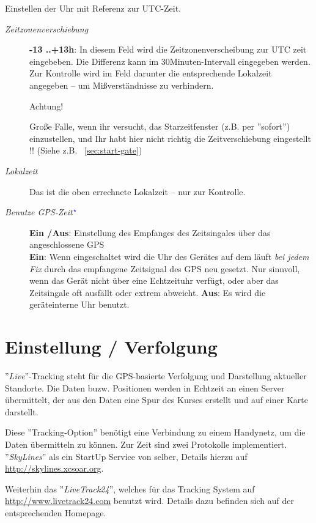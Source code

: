 Einstellen der Uhr mit Referenz zur UTC-Zeit.

\begin{description}
\item[\textit{Zeitzonenverschiebung}]  {\bf -13 ..+13h}: In diesem Feld wird die Zeitzonenverscheibung zur UTC zeit eingebeben. Die Differenz kann im 30Minuten-Intervall eingegeben werden.
Zur Kontrolle wird im Feld darunter die entsprechende Lokalzeit angegeben -- um Mißverständnisse zu verhindern.

Achtung! 

Große Falle, wenn ihr versucht, das Starzeitfenster (z.B. per ''sofort'') einzustellen, und Ihr habt \warning hier nicht richtig die Zeitverschiebung eingestellt !! (Siehe z.B. ~\ref{sec:start-gate})
\item[\textit{Lokalzeit}]  Das ist die oben errechnete Lokalzeit -- nur zur Kontrolle.
\item[\textit{Benutze GPS-Zeit$^{\textcolor{blue}{\star}}$}] {\bf Ein /Aus}: Einstellung des Empfanges des Zeitsingales über das angeschlossene GPS\\
{\bf Ein}: Wenn eingeschaltet wird die Uhr des Gerätes auf dem \xc läuft \textsl{bei jedem Fix} durch das empfangene Zeitsignal des GPS neu gesetzt.
\achtung
Nur sinnvoll, wenn das Gerät nicht über eine Echtzeituhr verfügt, oder aber das Zeitsingale oft ausfällt oder extrem abweicht.
{\bf Aus}: Es wird die geräteinterne Uhr benutzt.
\end{description}


\section{Einstellung / Verfolgung}

''{\it Live}''-Tracking steht für die GPS-basierte Verfolgung und Darstellung aktueller Standorte.
Die Daten buzw. Positionen werden in Echtzeit an einen Server übermittelt, der aus den Daten
eine Spur des Kurses erstellt und auf einer Karte darstellt.

Diese ''Tracking-Option'' benötigt eine  Verbindung zu einem Handynetz, um die Daten übermitteln zu können.
Zur Zeit sind zwei Protokolle implementiert. ''{\em SkyLines}''  als ein StartUp Service von \xc selber,
Details hierzu auf  \url{http://skylines.xcsoar.org}.


Weiterhin das ''{\em LiveTrack24}'', welches für das Tracking System auf \url{http://www.livetrack24.com} benutzt wird.
Details dazu befinden sich auf der entsprechenden Homepage.

